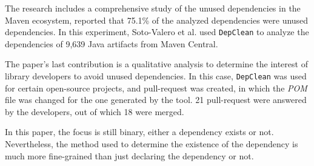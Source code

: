 The research includes a comprehensive study of the unused dependencies in the Maven ecosystem, reported that 75.1\% of the analyzed dependencies were unused dependencies. In this experiment, Soto-Valero et al. used \texttt{DepClean} to analyze the dependencies of 9,639 Java artifacts from Maven Central.

The paper's last contribution is a qualitative analysis to determine the interest of library developers to avoid unused dependencies. In this case, \texttt{DepClean} was used for certain open-source projects, and pull-request was created, in which the \textit{POM} file was changed for the one generated by the tool. 21 pull-request were answered by the developers, out of which 18 were merged.

In this paper, the focus is still binary, either a dependency exists or not. Nevertheless, the method used to determine the existence of the dependency is much more fine-grained than just declaring the dependency or not.
